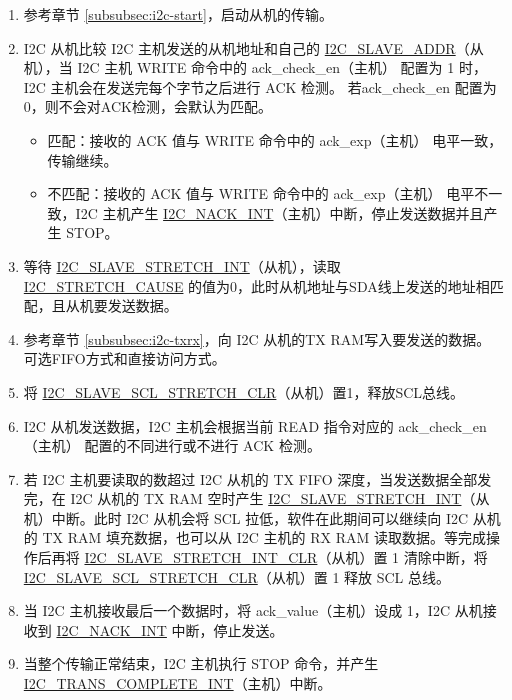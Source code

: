 \documentclass[main\_\_CN.tex]{subfiles}
\begin{document}
\begin{enumerate}
\item 参考章节 \ref{subsubsec:i2c-start}，启动从机的传输。
\item I2C 从机比较 I2C 主机发送的从机地址和自己的 \hyperref[fielddesc:I2CSLAVEADDR]{I2C\_SLAVE\_ADDR}（从机），当 I2C 主机 WRITE 命令中的 ack\_check\_en（主机） 配置为 1 时，I2C 主机会在发送完每个字节之后进行 ACK 检测。 若ack\_check\_en 配置为 0，则不会对ACK检测，会默认为匹配。
\begin{itemize}
\item 匹配：接收的 ACK 值与 WRITE 命令中的 ack\_exp（主机） 电平一致，传输继续。
\item 不匹配：接收的 ACK 值与 WRITE 命令中的 ack\_exp（主机） 电平不一致，I2C 主机产生 \hyperref[int:i2c-nack]{I2C\_NACK\_INT}（主机）中断，停止发送数据并且产生 STOP。
\end{itemize}

\item 等待 \hyperref[int:i2c-slave-stretch]{I2C\_SLAVE\_STRETCH\_INT}（从机），读取 \hyperref[fielddesc:I2CSTRETCHCAUSE]{I2C\_STRETCH\_CAUSE} 的值为0，此时从机地址与SDA线上发送的地址相匹配，且从机要发送数据。
\item 参考章节 \ref{subsubsec:i2c-txrx}，向 I2C 从机的TX RAM写入要发送的数据。可选FIFO方式和直接访问方式。
\item 将 \hyperref[fielddesc:I2CSLAVESCLSTRETCHCLR]{I2C\_SLAVE\_SCL\_STRETCH\_CLR}（从机）置1，释放SCL总线。

\item I2C 从机发送数据，I2C 主机会根据当前 READ 指令对应的 ack\_check\_en（主机） 配置的不同进行或不进行 ACK 检测。

\item 若 I2C 主机要读取的数超过 I2C 从机的 TX FIFO 深度，当发送数据全部发完，在 I2C 从机的 TX RAM 空时产生 \hyperref[int:i2c-slave-stretch]{I2C\_SLAVE\_STRETCH\_INT}（从机）中断。此时 I2C 从机会将 SCL 拉低，软件在此期间可以继续向 I2C 从机的 TX RAM 填充数据，也可以从 I2C 主机的 RX RAM 读取数据。等完成操作后再将 \hyperref[fielddesc:I2CSLAVESTRETCHINTCLR]{I2C\_SLAVE\_STRETCH\_INT\_CLR}（从机）置 1 清除中断，将 \hyperref[fielddesc:I2CSLAVESCLSTRETCHCLR]{I2C\_SLAVE\_SCL\_STRETCH\_CLR}（从机）置 1 释放 SCL 总线。

\item 当 I2C 主机接收最后一个数据时，将 ack\_value（主机）设成 1，I2C 从机接收到 \hyperref[int:i2c-nack]{I2C\_NACK\_INT} 中断，停止发送。

\item 当整个传输正常结束，I2C 主机执行 STOP 命令，并产生 \hyperref[int:i2c-trans-complete]{I2C\_TRANS\_COMPLETE\_INT}（主机）中断。

\end{enumerate}
\end{document}
